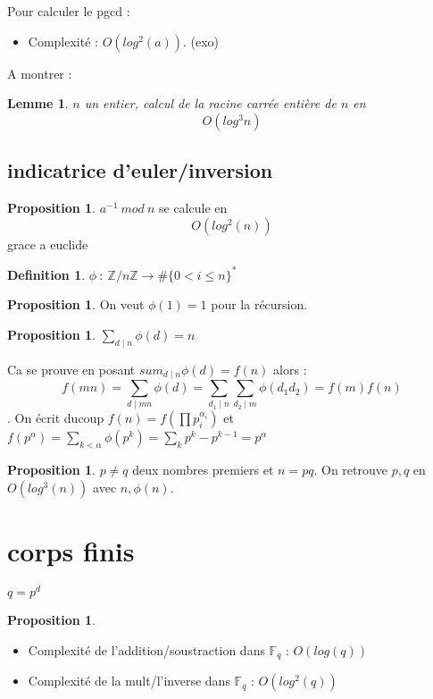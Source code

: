 \documentclass[12pt]{article}
\theoremstyle{plain}
\newtheorem{lem}[subsubsection]{Lemme}
\theoremstyle{definition}
\newtheorem{defn}[subsubsection]{Definition}
\newtheorem{prop}[subsubsection]{Proposition}
\newcommand{\Z}{\mathbb{Z}}
\begin{document}
Pour calculer le pgcd :
\begin{itemize}
    \item Complexité : $O(log^2(a))$. (exo)
\end{itemize}

A montrer :
\begin{lem}
    $n$ un entier, calcul de la racine carrée entière de $n$ en $$O(log^3n)$$
\end{lem}

\subsection{indicatrice d'euler/inversion}
\begin{prop}
    $a^{-1}~mod~n$ se calcule en $$O(log^2(n))$$ grace a euclide
\end{prop}

\begin{defn}
    $\phi~:~\Z/n\Z\rightarrow\#\{0<i\leq n\}^*$
\end{defn}

\begin{prop}
    On veut $\phi(1)=1$ pour la récursion.
\end{prop}

\begin{prop}
    $\sum_{d\mid n}\phi(d)=n$
\end{prop}
Ca se prouve en posant $sum_{d\mid n}\phi(d)=f(n)$ alors : $$f(mn)=\sum_{d\mid mn}\phi(d)=\sum_{d_1\mid n}\sum_{d_2\mid m}\phi(d_1d_2)=f(m)f(n)$$. 
On écrit ducoup $f(n)=f(\prod p_i^{\alpha_i})$ et $f(p^{\alpha})=\sum_{k<\alpha} \phi(p^k)=\sum_{k}p^{k}-p^{k-1}=p^{\alpha}$

\begin{prop}
    $p\ne q$ deux nombres premiers et $n=pq$. On retrouve $p,q$ en $O(log^3(n))$ avec $n,\phi(n)$.
\end{prop}

\section{corps finis}
$q=p^d$
\begin{prop}
    \begin{itemize}
        \item Complexité de l'addition/soustraction dans $\mathbb{F}_q$ : $O(log(q))$
        \item Complexité de la mult/l'inverse dans $\mathbb{F}_q$ : $O(log^2(q))$
    \end{itemize}
\end{prop}
\end{document}

